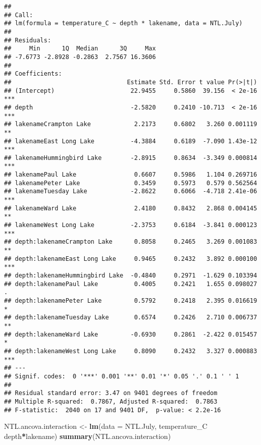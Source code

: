 \documentclass[]{article}
\newenvironment{Shaded}{\begin{snugshade}}{\end{snugshade}}
\newcommand{\DataTypeTok}[1]{\textcolor[rgb]{0.13,0.29,0.53}{#1}}
\newcommand{\KeywordTok}[1]{\textcolor[rgb]{0.13,0.29,0.53}{\textbf{#1}}}
\newcommand{\NormalTok}[1]{#1}
\newcommand{\OperatorTok}[1]{\textcolor[rgb]{0.81,0.36,0.00}{\textbf{#1}}}
\newcommand{\StringTok}[1]{\textcolor[rgb]{0.31,0.60,0.02}{#1}}
\begin{document}
\begin{verbatim}
## 
## Call:
## lm(formula = temperature_C ~ depth * lakename, data = NTL.July)
## 
## Residuals:
##     Min      1Q  Median      3Q     Max 
## -7.6773 -2.8928 -0.2863  2.7567 16.3606 
## 
## Coefficients:
##                                Estimate Std. Error t value Pr(>|t|)    
## (Intercept)                     22.9455     0.5860  39.156  < 2e-16 ***
## depth                           -2.5820     0.2410 -10.713  < 2e-16 ***
## lakenameCrampton Lake            2.2173     0.6802   3.260 0.001119 ** 
## lakenameEast Long Lake          -4.3884     0.6189  -7.090 1.43e-12 ***
## lakenameHummingbird Lake        -2.8915     0.8634  -3.349 0.000814 ***
## lakenamePaul Lake                0.6607     0.5986   1.104 0.269716    
## lakenamePeter Lake               0.3459     0.5973   0.579 0.562564    
## lakenameTuesday Lake            -2.8622     0.6066  -4.718 2.41e-06 ***
## lakenameWard Lake                2.4180     0.8432   2.868 0.004145 ** 
## lakenameWest Long Lake          -2.3753     0.6184  -3.841 0.000123 ***
## depth:lakenameCrampton Lake      0.8058     0.2465   3.269 0.001083 ** 
## depth:lakenameEast Long Lake     0.9465     0.2432   3.892 0.000100 ***
## depth:lakenameHummingbird Lake  -0.4840     0.2971  -1.629 0.103394    
## depth:lakenamePaul Lake          0.4005     0.2421   1.655 0.098027 .  
## depth:lakenamePeter Lake         0.5792     0.2418   2.395 0.016619 *  
## depth:lakenameTuesday Lake       0.6574     0.2426   2.710 0.006737 ** 
## depth:lakenameWard Lake         -0.6930     0.2861  -2.422 0.015457 *  
## depth:lakenameWest Long Lake     0.8090     0.2432   3.327 0.000883 ***
## ---
## Signif. codes:  0 '***' 0.001 '**' 0.01 '*' 0.05 '.' 0.1 ' ' 1
## 
## Residual standard error: 3.47 on 9401 degrees of freedom
## Multiple R-squared:  0.7867, Adjusted R-squared:  0.7863 
## F-statistic:  2040 on 17 and 9401 DF,  p-value: < 2.2e-16
\end{verbatim}

\begin{Shaded}
\begin{Highlighting}[]
\NormalTok{NTL.ancova.interaction <-}\StringTok{ }\KeywordTok{lm}\NormalTok{(}\DataTypeTok{data =}\NormalTok{ NTL.July, temperature_C }\OperatorTok{~}\StringTok{ }\NormalTok{depth}\OperatorTok{*}\NormalTok{lakename)}
\KeywordTok{summary}\NormalTok{(NTL.ancova.interaction)}
\end{Highlighting}
\end{Shaded}
\end{document}
